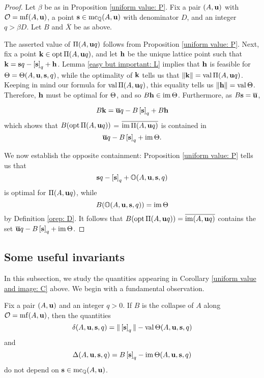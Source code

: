 \documentclass[11pt]{amsart}
\renewcommand{\!}[1]{{\color{red}\text{$\star$\,}#1\,$\star$}}
\newcommand{\ol}[1]{\overline{#1}}
\begin{document}
\begin{proof}
Let $\beta$ be as in Proposition \ref{uniform value: P}.  Fix a pair $(A, \mathbf{u})$ with $\mathcal{O} = \operatorname{mf}(A, \mathbf{u})$, a point $\mathbf{s} \in \operatorname{mc}_{\mathbb{Q}}(A, \mathbf{u})$ with denominator $D$, and an integer $q > \beta D$.  Let $B$ and $\ol{X}$ be as above.

The asserted value of $\Pi(A, \mathbf{u}q)$ follows from Proposition \ref{uniform value: P}.  Next, fix a point $\mathbf{k} \in \operatorname{opt} \Pi(A, \mathbf{u}q)$, and let $\mathbf{h}$ be the unique lattice point such that $\mathbf{k} = \mathbf{s}q - \left[ \mathbf{s} \right]_q + \mathbf{h}$.  Lemma \ref{easy but important: L} implies that $\mathbf{h}$ is feasible for $\Theta = \Theta(A, \mathbf{u}, \mathbf{s}, q)$, while the optimality of $\mathbf{k}$ tells us that $\| \mathbf{k} \| = \operatorname{val} \Pi(A, \mathbf{u}q)$.  Keeping in mind our formula for $\operatorname{val} \Pi(A, \mathbf{u}q)$, this equality tells us $\| \mathbf{h} \| = \operatorname{val} \Theta$.    Therefore, $\mathbf{h}$ must be optimal for $\Theta$,  and so $B \mathbf{h} \in \operatorname{im} \Theta$.  Furthermore, as $B \vv{s} = \ol{\vv{u}}$, 

\[ B \vv{k} = \ol{\vv{u}} q - B \tail{\vv{s}}_q + B \vv{h}\]  
which shows that $B ( \operatorname{opt} \Pi(A, \mathbf{u}q))$ = $\ol{\im \IP(A, \vv{u}q)}$ is contained in 
\[ \ol{\vv{u}} q - B \tail{\vv{s}}_q + \im \ip.\]

We now establish the opposite containment:  Proposition \ref{uniform value: P} tells us that \[  \mathbf{s}q - \left[ \mathbf{s} \right]_q + \mathbb{O}(A, \mathbf{u}, \mathbf{s}, q)\] is optimal for $\Pi(A, \mathbf{u}q)$,  while \[ B( \mathbb{O}(A, \mathbf{u}, \mathbf{s}, q)) = \operatorname{im} \Theta \] by Definition \ref{orep: D}.   It follows that $B(\opt \IP(A, \vv{u}q)) = \ol{\im(A, \vv{u}q)}$ contains the set $\ol{\vv{u}} q - B \tail{\vv{s}}_q + \im \ip$.
\end{proof}

\subsection{Some useful invariants}
\label{useful-invariants: ss}

In this subsection, we study the quantities appearing in Corollary \ref{uniform value and image: C} above.  We begin with a fundamental observation.

\begin{corollary}  
\label{independence: C} Fix a pair $(A, \mathbf{u})$ and an integer $q>0$.  If $B$ is the collapse of $A$ along $\mathcal{O} = \operatorname{mf}(A, \mathbf{u})$, then the quantities
\[   \delta(A, \mathbf{u}, \mathbf{s}, q)  = \| \left[ \mathbf{s} \right]_q \|  - \operatorname{val} \Theta(A, \mathbf{u}, \mathbf{s}, q)\] and 
\[ \Delta(A, \mathbf{u}, \mathbf{s}, q)  = B \left[ \mathbf{s} \right]_q - \operatorname{im}  \Theta( A, \mathbf{u}, \mathbf{s}, q)  \] 
do not depend on  $\mathbf{s} \in \operatorname{mc}_{\mathbb{Q}}(A, \mathbf{u})$.  
\end{corollary}
\end{document}
